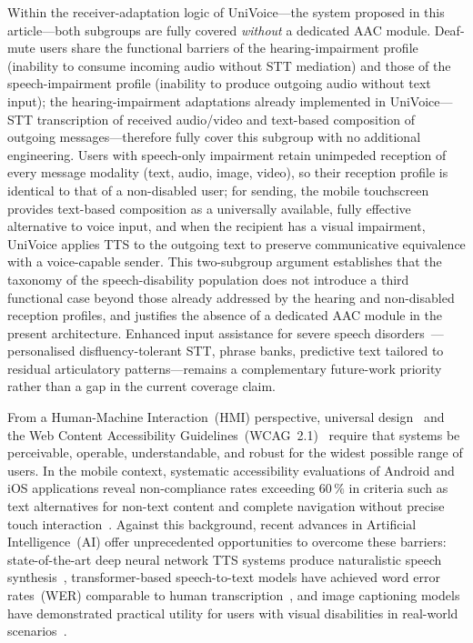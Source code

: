 \documentclass[journal]{IEEEtran}
\begin{document}
	Within the receiver-adaptation logic of \textsf{UniVoice}---the system proposed in this article---both subgroups are fully covered \emph{without} a dedicated AAC module. Deaf-mute users share the functional barriers of the hearing-impairment profile (inability to consume incoming audio without STT mediation) and those of the speech-impairment profile (inability to produce outgoing audio without text input); the hearing-impairment adaptations already implemented in \textsf{UniVoice}---STT transcription of received audio/video and text-based composition of outgoing messages---therefore fully cover this subgroup with no additional engineering. Users with speech-only impairment retain unimpeded reception of every message modality (text, audio, image, video), so their reception profile is identical to that of a non-disabled user; for sending, the mobile touchscreen provides text-based composition as a universally available, fully effective alternative to voice input, and when the recipient has a visual impairment, \textsf{UniVoice} applies TTS to the outgoing text to preserve communicative equivalence with a voice-capable sender. This two-subgroup argument establishes that the taxonomy of the speech-disability population does not introduce a third functional case beyond those already addressed by the hearing and non-disabled reception profiles, and justifies the absence of a dedicated AAC module in the present architecture. Enhanced input assistance for severe speech disorders~\cite{bleakley2022,costanzo2023}---personalised disfluency-tolerant STT, phrase banks, predictive text tailored to residual articulatory patterns---remains a complementary future-work priority rather than a gap in the current coverage claim.
	
	From a Human-Machine Interaction~(HMI) perspective, universal design~\cite{story1998} and the Web Content Accessibility Guidelines~(WCAG~2.1)~\cite{w3c2018} require that systems be perceivable, operable, understandable, and robust for the widest possible range of users. In the mobile context, systematic accessibility evaluations of Android and iOS applications reveal non-compliance rates exceeding $60\,\%$ in criteria such as text alternatives for non-text content and complete navigation without precise touch interaction~\cite{chen2022,acosta2021}. Against this background, recent advances in Artificial Intelligence~(AI) offer unprecedented opportunities to overcome these barriers: state-of-the-art deep neural network TTS systems produce naturalistic speech synthesis~\cite{tan2021}, transformer-based speech-to-text models have achieved word error rates~(WER) comparable to human transcription~\cite{baevski2020}, and image captioning models have demonstrated practical utility for users with visual disabilities in real-world scenarios~\cite{dognin2021}.
	
\end{document}
